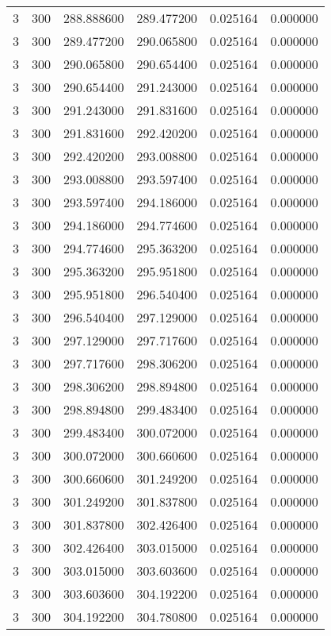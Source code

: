 \begin{longtable}{rrrrrr}
3 & 300 & 288.888600 & 289.477200 & 0.025164 & 0.000000 \\
3 & 300 & 289.477200 & 290.065800 & 0.025164 & 0.000000 \\
3 & 300 & 290.065800 & 290.654400 & 0.025164 & 0.000000 \\
3 & 300 & 290.654400 & 291.243000 & 0.025164 & 0.000000 \\
3 & 300 & 291.243000 & 291.831600 & 0.025164 & 0.000000 \\
3 & 300 & 291.831600 & 292.420200 & 0.025164 & 0.000000 \\
3 & 300 & 292.420200 & 293.008800 & 0.025164 & 0.000000 \\
3 & 300 & 293.008800 & 293.597400 & 0.025164 & 0.000000 \\
3 & 300 & 293.597400 & 294.186000 & 0.025164 & 0.000000 \\
3 & 300 & 294.186000 & 294.774600 & 0.025164 & 0.000000 \\
3 & 300 & 294.774600 & 295.363200 & 0.025164 & 0.000000 \\
3 & 300 & 295.363200 & 295.951800 & 0.025164 & 0.000000 \\
3 & 300 & 295.951800 & 296.540400 & 0.025164 & 0.000000 \\
3 & 300 & 296.540400 & 297.129000 & 0.025164 & 0.000000 \\
3 & 300 & 297.129000 & 297.717600 & 0.025164 & 0.000000 \\
3 & 300 & 297.717600 & 298.306200 & 0.025164 & 0.000000 \\
3 & 300 & 298.306200 & 298.894800 & 0.025164 & 0.000000 \\
3 & 300 & 298.894800 & 299.483400 & 0.025164 & 0.000000 \\
3 & 300 & 299.483400 & 300.072000 & 0.025164 & 0.000000 \\
3 & 300 & 300.072000 & 300.660600 & 0.025164 & 0.000000 \\
3 & 300 & 300.660600 & 301.249200 & 0.025164 & 0.000000 \\
3 & 300 & 301.249200 & 301.837800 & 0.025164 & 0.000000 \\
3 & 300 & 301.837800 & 302.426400 & 0.025164 & 0.000000 \\
3 & 300 & 302.426400 & 303.015000 & 0.025164 & 0.000000 \\
3 & 300 & 303.015000 & 303.603600 & 0.025164 & 0.000000 \\
3 & 300 & 303.603600 & 304.192200 & 0.025164 & 0.000000 \\
3 & 300 & 304.192200 & 304.780800 & 0.025164 & 0.000000 \\

\end{longtable}
